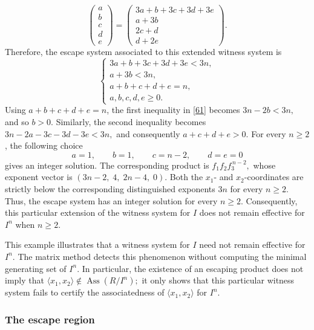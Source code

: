 \documentclass[11pt]{amsart}   %
\begin{document}
\begin{exm}
\[\begin{pmatrix}
a\\
b\\
c\\
d\\
e
\end{pmatrix}
=
\begin{pmatrix}
3a+b+3c+3d+3e\\
a+3b\\
2c+d\\
d+2e
\end{pmatrix}.
\]
Therefore, the escape system associated to this extended witness
system is
\begin{equation}
\begin{cases}
3a+b+3c+3d+3e<3n,\\
a+3b<3n,\\
a+b+c+d+e=n,\\
a,b,c,d,e\geq0.
\end{cases}
\label{61}
\end{equation}
Using $a+b+c+d+e=n$, the first inequality in \eqref{61} becomes $3n-2b<3n,$
and so $b>0$. Similarly, the second inequality becomes $3n-2a-3c-3d-3e<3n,$
and consequently $a+c+d+e>0.$ For every $n\geq2$, the following choice
\[
a=1,\qquad b=1,\qquad c=n-2,\qquad d=e=0
\]
gives an integer solution. The corresponding product is $f_1f_2f_3^{\,n-2},$ whose exponent vector is
 $(3n-2,\;4,\;2n-4,\;0).$ Both the $x_1$- and $x_2$-coordinates are strictly below the
corresponding distinguished exponents $3n$ for every $n\geq2$.
Thus, the escape system has an integer solution for every $n\geq2$.
Consequently, this particular extension of the witness system for $I$
does not remain effective for $I^n$ when $n\geq2$.

This example illustrates that a witness system for $I$ need not remain
effective for $I^n$. The matrix method detects this phenomenon without
computing the minimal generating set of $I^n$. In particular, the
existence of an escaping product does not imply that $\langle x_1,x_2\rangle\notin\operatorname{Ass}(R/I^n);$
it only shows that this particular witness system fails to certify the
associatedness of $\langle x_1,x_2\rangle$ for $I^n$.
\end{exm}





\subsubsection{The escape region}
\label{sec_escape_region}
\end{document}
